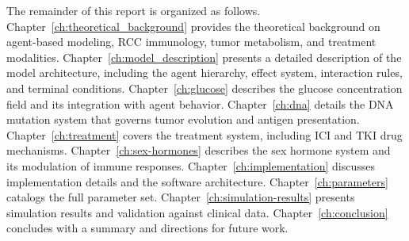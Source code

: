 The remainder of this report is organized as follows. Chapter~\ref{ch:theoretical_background} provides the theoretical background on agent-based modeling, RCC immunology, tumor metabolism, and treatment modalities. Chapter~\ref{ch:model_description} presents a detailed description of the model architecture, including the agent hierarchy, effect system, interaction rules, and terminal conditions. Chapter~\ref{ch:glucose} describes the glucose concentration field and its integration with agent behavior. Chapter~\ref{ch:dna} details the DNA mutation system that governs tumor evolution and antigen presentation. Chapter~\ref{ch:treatment} covers the treatment system, including ICI and TKI drug mechanisms. Chapter~\ref{ch:sex-hormones} describes the sex hormone system and its modulation of immune responses. Chapter~\ref{ch:implementation} discusses implementation details and the software architecture. Chapter~\ref{ch:parameters} catalogs the full parameter set. Chapter~\ref{ch:simulation-results} presents simulation results and validation against clinical data. Chapter~\ref{ch:conclusion} concludes with a summary and directions for future work.
